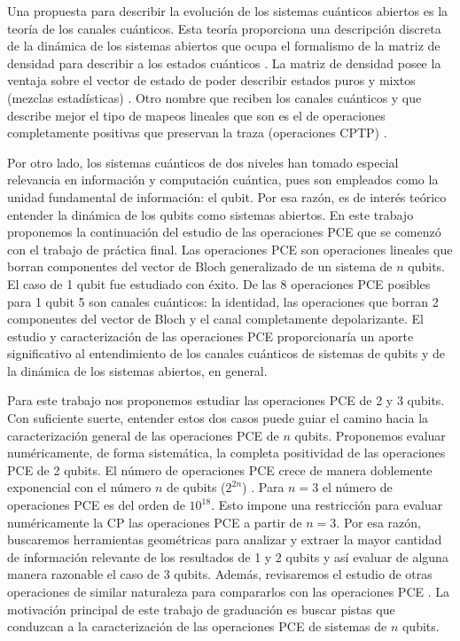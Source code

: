 Una propuesta para describir la evolución de los sistemas cuánticos abiertos
es la teoría de los canales cuánticos. Esta teoría proporciona una descripción
discreta de la dinámica de los sistemas abiertos que ocupa el formalismo
de la matriz de densidad para describir a los estados cuánticos
\cite{nielsen_chuang_2011}. La matriz
de densidad posee la ventaja sobre el vector de estado de poder describir
estados puros y mixtos (mezclas estadísticas) \cite{sakurai_napolitano_2017}. 
Otro nombre que reciben 
los canales cuánticos y que describe mejor el tipo de mapeos lineales 
que son es el de operaciones completamente positivas que preservan la traza 
(operaciones CPTP) \cite{bengtsson_zyczkowski_2017}.

Por otro lado, los sistemas cuánticos de dos niveles han tomado especial
relevancia en información y computación cuántica, pues son empleados 
como la unidad fundamental de información: el qubit. Por esa razón, es
de interés teórico entender la dinámica de los qubits como sistemas 
abiertos. En este trabajo proponemos la continuación del estudio de 
las operaciones PCE que se comenzó con el trabajo de práctica final.
Las operaciones PCE son operaciones lineales que borran componentes
del vector de Bloch generalizado de un sistema de $n$ qubits. El caso 
de 1 qubit fue estudiado con éxito. De las 8 operaciones PCE posibles para
1 qubit 5 son canales cuánticos: la identidad, las operaciones que borran 2 
componentes del vector de Bloch y el canal completamente depolarizante.
El estudio y caracterización de las operaciones PCE proporcionaría 
un aporte significativo al entendimiento de los canales cuánticos de
sistemas de qubits y de la dinámica de los sistemas abiertos, en general.

Para este trabajo nos proponemos estudiar las operaciones PCE de 
2 y 3 qubits. Con suficiente suerte, entender estos dos casos
puede guiar el camino hacia la caracterización general de las operaciones
PCE de $n$ qubits. Proponemos evaluar numéricamente, de forma sistemática, 
la completa positividad de las operaciones PCE de 2 qubits. El número de
operaciones PCE crece de manera doblemente exponencial con el número $n$ de
qubits ($2^{2n}$) . Para $n=3$ el número de 
operaciones PCE es del orden de $10^{18}$. Esto impone una restricción  
para evaluar numéricamente la CP las operaciones PCE a partir de $n=3$.
Por esa razón, buscaremos herramientas geométricas para analizar 
y extraer la mayor cantidad de información relevante de los 
resultados de 1 y 2 qubits y así evaluar de alguna manera razonable
el caso de 3 qubits. Además, revisaremos el 
estudio de otras operaciones de similar naturaleza para compararlos
con las operaciones PCE \cite{nathanson2007pauli}. 
La motivación principal de este trabajo de graduación 
es buscar pistas que conduzcan a la caracterización de las 
operaciones PCE de sistemas de $n$ qubits.


